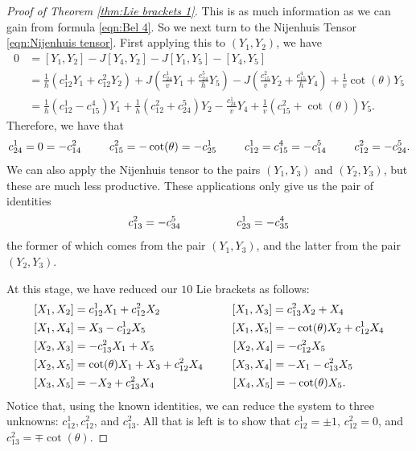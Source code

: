 \documentclass[10pt]{amsart}
\def\th{\theta}
\theoremstyle{definition}
\theoremstyle{remark}
\numberwithin{equation}{section}
\begin{document}
\begin{proof}[Proof of Theorem \ref{thm:Lie brackets 1}]
This is as much information as we can gain from formula \eqref{eqn:Bel 4}.  
So we next turn to the Nijenhuis Tensor \eqref{eqn:Nijenhuis tensor}.  
First applying this to $(Y_1,Y_2)$, we have
	\begin{align*}
	0 &= [Y_1,Y_2] - J[Y_4,Y_2] - J[Y_1,Y_5] - [Y_4,Y_5]  \\
	&= \frac{1}{h} (c_{12}^1 Y_1 + c_{12}^2 Y_2) + J \left( \frac{c_{24}^1}{v} Y_1 + \frac{c_{24}^5}{h} Y_5 \right) - J \left( \frac{c_{15}^2}{v} Y_2 + \frac{c_{15}^4}{h} Y_4 \right) + \frac{1}{v} \cot(\th) Y_5  \\
	&= \frac{1}{h} \left( c_{12}^1 - c_{15}^4 \right) Y_1 + \frac{1}{h} (c_{12}^2 + c_{24}^5) Y_2 - \frac{c_{24}^1}{v} Y_4 + \frac{1}{v} (c_{15}^2 + \cot(\th)) Y_5.
	\end{align*}
Therefore, we have that 
	\begin{equation*}
	c_{24}^1 = 0 = -c_{14}^2 \hskip 25pt c_{15}^2 = -\cot(\th) = -c_{25}^1  \hskip 25pt  c_{12}^1 = c_{15}^4 = -c_{14}^5  \hskip 25pt  c_{12}^2 = -c_{24}^5.  
	\end{equation*}
We can also apply the Nijenhuis tensor to the pairs $(Y_1,Y_3)$ and $(Y_2,Y_3)$, but these are much less productive.  
These applications only give us the pair of identities
	\begin{equation*}
	c_{13}^2 = - c_{34}^5	\hskip 50pt	c_{23}^1 = - c_{35}^4
	\end{equation*}
the former of which comes from the pair $(Y_1,Y_3)$, and the latter from the pair $(Y_2,Y_3)$.  

At this stage, we have reduced our $10$ Lie brackets as follows:
	\begin{align*}
	&[X_1,X_2] =  c_{12}^1 X_1 + c_{12}^2 X_2  		\hskip 64pt  	[X_1,X_3] =  c_{13}^2 X_2 + X_4  \\
	&[X_1,X_4] =  X_3 - c_{12}^1 X_5  	\hskip 77pt	[X_1,X_5] =  - \cot(\th) X_2 + c_{12}^1 X_4  \\
	&[X_2,X_3] =  -c_{13}^2 X_1 + X_5  	\hskip 70pt	[X_2,X_4] =  -c_{12}^2 X_5  \\
	&[X_2,X_5] =  \cot(\th) X_1 + X_3 + c_{12}^2 X_4  	\hskip 26pt	[X_3,X_4] =  -X_1 - c_{13}^2 X_5  \\
	&[X_3,X_5] =  -X_2 + c_{13}^2 X_4  	\hskip 70pt	[X_4,X_5] =  - \cot(\th) X_5.
	\end{align*}
Notice that, using the known identities, we can reduce the system to three unknowns:  $c_{12}^1, c_{12}^2$, and $c_{13}^2$.  
All that is left is to show that $c_{12}^1 = \pm 1$, $c_{12}^2 = 0$, and $c_{13}^2 = \mp \cot(\th)$.  


\end{proof}
\end{document}
